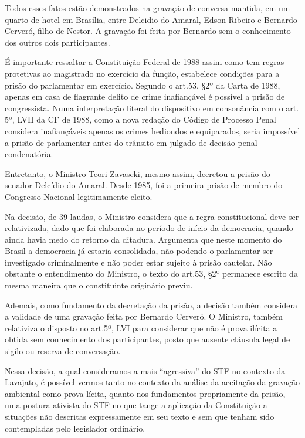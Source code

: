 {Todos esses fatos estão demonstrados na gravação de conversa mantida, em
um quarto de hotel em Brasília, entre Delcidio do Amaral, Edson Ribeiro
e Bernardo Cerveró, filho de Nestor. A gravação foi feita por Bernardo
sem o conhecimento dos outros dois participantes.

É importante ressaltar a Constituição Federal de 1988 assim como tem
regras protetivas ao magistrado no exercício da função, estabelece
condições para a prisão do parlamentar em exercício. Segundo o art.53,
§2º da Carta de 1988, apenas em casa de flagrante delito de crime
inafiançável é possível a prisão de congressista. Numa interpretação
literal do dispositivo em consonância com o art. 5º, LVII da CF de 1988,
como a nova redação do Código de Processo Penal considera inafiançáveis
apenas os crimes hediondos e equiparados, seria impossível a prisão de
parlamentar antes do trânsito em julgado de decisão penal condenatória.

Entretanto, o Ministro Teori Zavascki, mesmo assim, decretou a prisão do
senador Delcídio do Amaral. Desde 1985, foi a primeira prisão de membro
do Congresso Nacional legitimamente eleito.

Na decisão, de 39 laudas, o Ministro considera que a regra
constitucional deve ser relativizada, dado que foi elaborada no período
de início da democracia, quando ainda havia medo do retorno da ditadura.
Argumenta que neste momento do Brasil a democracia já estaria
consolidada, não podendo o parlamentar ser investigado criminalmente e
não poder estar sujeito à prisão cautelar. Não obstante o entendimento
do Ministro, o texto do art.53, §2º permanece escrito da mesma maneira
que o constituinte originário previu.

Ademais, como fundamento da decretação da prisão, a decisão também
considera a validade de uma gravação feita por Bernardo Cerveró. O
Ministro, também relativiza o disposto no art.5º, LVI para considerar
que não é prova ilícita a obtida sem conhecimento dos participantes,
posto que ausente cláusula legal de sigilo ou reserva de conversação.

Nessa decisão, a qual consideramos a mais ``agressiva'' do STF no
contexto da Lavajato, é possível vermos tanto no contexto da análise da
aceitação da gravação ambiental como prova lícita, quanto nos
fundamentos propriamente da prisão, uma postura ativista do STF no que
tange a aplicação da Constituição a situações não descritas
expressamente em seu texto e sem que tenham sido contempladas pelo
legislador ordinário.

}
